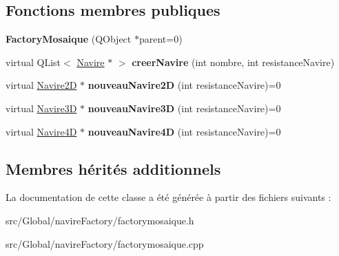 \subsection*{Fonctions membres publiques}
\begin{DoxyCompactItemize}
\item 
{\bfseries Factory\+Mosaique} (Q\+Object $\ast$parent=0)\hypertarget{class_factory_mosaique_aa0cdf96f0abd1623e63c81c268b15bb9}{}\label{class_factory_mosaique_aa0cdf96f0abd1623e63c81c268b15bb9}

\item 
virtual Q\+List$<$ \hyperlink{class_navire}{Navire} $\ast$ $>$ {\bfseries creer\+Navire} (int nombre, int resistance\+Navire)\hypertarget{class_factory_mosaique_ac0ccf73da963831249e504287e3c8d94}{}\label{class_factory_mosaique_ac0ccf73da963831249e504287e3c8d94}

\item 
virtual \hyperlink{class_navire2_d}{Navire2D} $\ast$ {\bfseries nouveau\+Navire2D} (int resistance\+Navire)=0\hypertarget{class_factory_mosaique_a68a26f2ad764f31e1bf03576a841808b}{}\label{class_factory_mosaique_a68a26f2ad764f31e1bf03576a841808b}

\item 
virtual \hyperlink{class_navire3_d}{Navire3D} $\ast$ {\bfseries nouveau\+Navire3D} (int resistance\+Navire)=0\hypertarget{class_factory_mosaique_a6028cfbc8fdc3825db31f39973ec9ebd}{}\label{class_factory_mosaique_a6028cfbc8fdc3825db31f39973ec9ebd}

\item 
virtual \hyperlink{class_navire4_d}{Navire4D} $\ast$ {\bfseries nouveau\+Navire4D} (int resistance\+Navire)=0\hypertarget{class_factory_mosaique_ac2adb008a36298015b47f32b2e58c25a}{}\label{class_factory_mosaique_ac2adb008a36298015b47f32b2e58c25a}

\end{DoxyCompactItemize}
\subsection*{Membres hérités additionnels}


La documentation de cette classe a été générée à partir des fichiers suivants \+:\begin{DoxyCompactItemize}
\item 
src/\+Global/navire\+Factory/factorymosaique.\+h\item 
src/\+Global/navire\+Factory/factorymosaique.\+cpp\end{DoxyCompactItemize}
